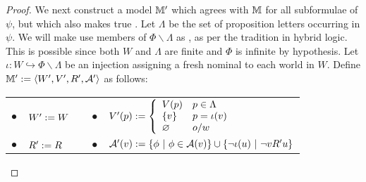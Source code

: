\begin{proof}
    
    
  
  
  
  We next construct a model $\mathbbm{M}'$ which agrees with
  $\mathbbm{M}$ for all subformulae of $\psi$, but which also makes true
  .  Let $\Lambda$ be the set of proposition
  letters occurring in $\psi$.  We will make use members of $\Phi \backslash
  \Lambda$ as {}, as per the tradition in hybrid logic.  This
  is possible since both $W$ and $\Lambda$ are finite and $\Phi$ is infinite
  by hypothesis.  Let $\iota : W  \hookrightarrow \Phi \backslash
  \Lambda$ be an injection assigning a fresh nominal to each
  world in $W$.  Define $\mathbbm{M}' \assign \langle W',
  V', R', \mathcal{A}' \rangle$ as follows:
  \begin{center}
    \begin{tabular}{lllll}
      $\bullet$ & $W' \assign W$ &  & $\bullet$ & $V' (p) \assign \left\{
      \begin{array}{ll}
        V (p) & p \in \Lambda\\
        \{v\} & p = \iota (v)\\
        \varnothing & o / w
      \end{array} \right.$\\
      $\bullet$ & $R' \assign R$ & {\hspace{3em}} & $\bullet$ &
      $\mathcal{A}'(v) \assign \{\phi \  |\ \phi \in \mathcal{A}(v)
      \} \cup \{\neg \iota (u) \  | \  \neg v R' u\}$
    \end{tabular}
  \end{center}
  

\end{proof}
